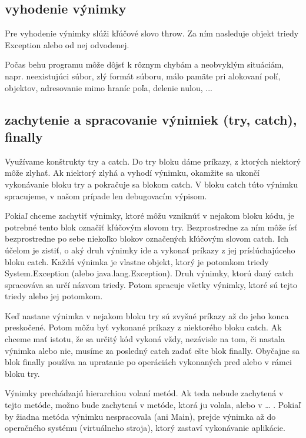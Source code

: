 	\subsection{vyhodenie výnimky}

Pre vyhodenie výnimky slúži kľúčové slovo throw. Za ním nasleduje objekt triedy Exception alebo od nej odvodenej.


	Počas behu programu môže dôjsť k rôznym chybám a neobvyklým situáciám, napr. neexistujúci súbor, zlý formát súboru, málo pamäte pri alokovaní polí, objektov, adresovanie mimo hraníc poľa, delenie nulou, ...


	\subsection{zachytenie a spracovanie výnimiek (try, catch), finally}

	Využívame konštrukty try a catch.
	Do try bloku dáme príkazy, z ktorých niektorý môže zlyhať.
	Ak niektorý zlyhá a vyhodí výnimku, okamžite sa ukončí vykonávanie bloku try a pokračuje sa blokom catch. V bloku catch túto výnimku spracujeme, v našom prípade len debugovacím výpisom.


	Pokiaľ chceme zachytiť výnimky, ktoré môžu vzniknúť v nejakom bloku kódu, je potrebné tento blok označiť kľúčovým slovom try. Bezprostredne za ním môže ísť bezprostredne po sebe niekoľko blokov označených kľúčovým slovom catch. Ich účelom je zistiť, o aký druh výnimky ide a vykonať príkazy z jej príslúchajúceho bloku catch. Každá výnimka je vlastne objekt, ktorý je potomkom triedy System.Exception (alebo java.lang.Exception). Druh výnimky, ktorú daný catch spracováva sa určí názvom triedy. Potom spracuje všetky výnimky, ktoré sú tejto triedy alebo jej potomkom.

	Keď nastane výnimka v nejakom bloku try sú zvyšné príkazy až do jeho konca preskočené. Potom môžu byť vykonané príkazy z niektorého bloku catch. Ak chceme mať istotu, že sa určitý kód vykoná vždy, nezávisle na tom, či nastala výnimka alebo nie, musíme za posledný catch zadať ešte blok finally. Obyčajne sa blok finally používa na upratanie po operáciách vykonaných pred alebo v rámci bloku try.



Výnimky prechádzajú hierarchiou volaní metód. Ak teda nebude zachytená v tejto metóde, možno bude zachytená v metóde, ktorá ju volala, alebo v … . Pokiaľ by žiadna metóda výnimku nespracovala (ani Main), prejde výnimka až do operačného systému (virtuálneho stroja), ktorý zastaví vykonávanie aplikácie.

